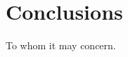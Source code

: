 \documentclass[manuscript,screen,review,anonymous]{acmart}
\begin{document}
\section{Conclusions}
\label{sec:conclusions}


\begin{acks}
  To whom it may concern.
\end{acks}



\end{document}
